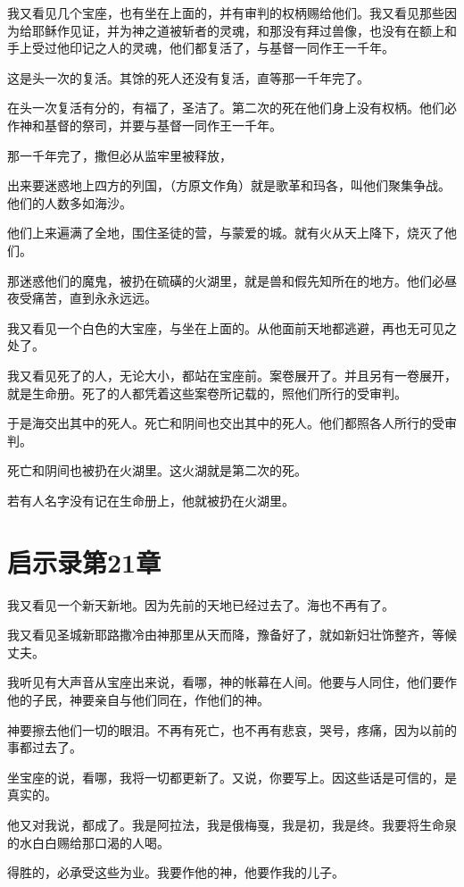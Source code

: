 \documentclass[12pt,oneside]{book}
\begin{document}
我又看见几个宝座，也有坐在上面的，并有审判的权柄赐给他们。我又看见那些因为给耶稣作见证，并为神之道被斩者的灵魂，和那没有拜过兽像，也没有在额上和手上受过他印记之人的灵魂，他们都复活了，与基督一同作王一千年。

这是头一次的复活。其馀的死人还没有复活，直等那一千年完了。

在头一次复活有分的，有福了，圣洁了。第二次的死在他们身上没有权柄。他们必作神和基督的祭司，并要与基督一同作王一千年。

那一千年完了，撒但必从监牢里被释放，

出来要迷惑地上四方的列国，（方原文作角）就是歌革和玛各，叫他们聚集争战。他们的人数多如海沙。

他们上来遍满了全地，围住圣徒的营，与蒙爱的城。就有火从天上降下，烧灭了他们。

那迷惑他们的魔鬼，被扔在硫磺的火湖里，就是兽和假先知所在的地方。他们必昼夜受痛苦，直到永永远远。

我又看见一个白色的大宝座，与坐在上面的。从他面前天地都逃避，再也无可见之处了。

我又看见死了的人，无论大小，都站在宝座前。案卷展开了。并且另有一卷展开，就是生命册。死了的人都凭着这些案卷所记载的，照他们所行的受审判。

于是海交出其中的死人。死亡和阴间也交出其中的死人。他们都照各人所行的受审判。

死亡和阴间也被扔在火湖里。这火湖就是第二次的死。

若有人名字没有记在生命册上，他就被扔在火湖里。

\chapter{启示录第21章}
我又看见一个新天新地。因为先前的天地已经过去了。海也不再有了。

我又看见圣城新耶路撒冷由神那里从天而降，豫备好了，就如新妇壮饰整齐，等候丈夫。

我听见有大声音从宝座出来说，看哪，神的帐幕在人间。他要与人同住，他们要作他的子民，神要亲自与他们同在，作他们的神。

神要擦去他们一切的眼泪。不再有死亡，也不再有悲哀，哭号，疼痛，因为以前的事都过去了。

坐宝座的说，看哪，我将一切都更新了。又说，你要写上。因这些话是可信的，是真实的。

他又对我说，都成了。我是阿拉法，我是俄梅戛，我是初，我是终。我要将生命泉的水白白赐给那口渴的人喝。

得胜的，必承受这些为业。我要作他的神，他要作我的儿子。
\end{document}
